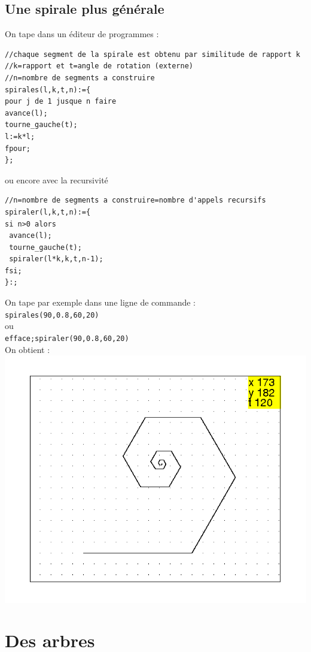 \documentclass[a4paper,11pt]{book}
\begin{document}
\subsection{Une spirale plus g\'en\'erale}
On tape dans un \'editeur de programmes :
\begin{verbatim}
//chaque segment de la spirale est obtenu par similitude de rapport k 
//k=rapport et t=angle de rotation (externe)
//n=nombre de segments a construire
spirales(l,k,t,n):={
pour j de 1 jusque n faire
avance(l);
tourne_gauche(t);
l:=k*l;
fpour;
};
\end{verbatim}
ou encore avec la recursivit\'e
\begin{verbatim}
//n=nombre de segments a construire=nombre d'appels recursifs
spiraler(l,k,t,n):={
si n>0 alors
 avance(l);
 tourne_gauche(t);
 spiraler(l*k,k,t,n-1);
fsi;
}:;
\end{verbatim} 
On tape par exemple dans une ligne de commande :\\
{\tt spirales(90,0.8,60,20)}\\
ou\\
{\tt efface;spiraler(90,0.8,60,20)}\\
On obtient :\\
\includegraphics[width=\textwidth]{tortspirr}
%

\section{Des arbres}
\end{document}
